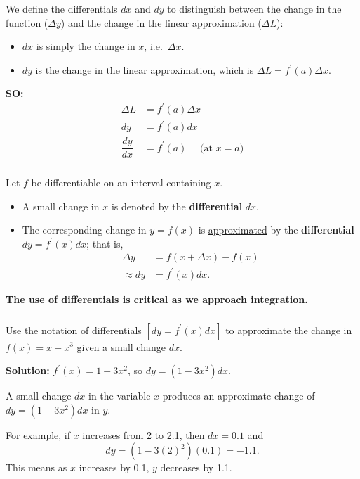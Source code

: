 \documentclass[cal1spr16Lectures.tex]{subfiles}
\begin{document}
\begin{frame}
\small
We define the differentials $dx$ and $dy$ to distinguish between the \alert{change in the function ($\Delta y$)} and the \alert{change in the linear approximation ($\Delta L$)}: 
\begin{itemize}
\item $dx$ is simply the change in $x$, i.e.\ $\Delta x$.
\item $dy$ is the change in the linear approximation, which is $\Delta L=f^{\prime}(a) \Delta x$.
\end{itemize}

{\bf SO:}
\begin{align*}
\Delta L &= f^{\prime}(a) \Delta x \\[0.5pc]
dy &= f^{\prime}(a) dx \\[0.5pc]
\dfrac{dy}{dx} &= f^{\prime}(a)\quad \text{ (at $x=a$)}
\end{align*}
\end{frame}

\begin{frame}
\frametitle{}
\small
\begin{dfn} Let $f$ be differentiable on an interval containing $x$.
\begin{itemize}
\item A small change in $x$ is denoted by the {\bf differential} $dx$.
\item The corresponding change in $y=f(x)$ is \underline{approximated} by the {\bf differential} $dy=f^{\prime}(x)dx$; that is,
\begin{align*}
\Delta y& = f(x+\Delta x)-f(x) \\[0.5pc]
\approx dy &= f^{\prime}(x)dx.
\end{align*}
\end{itemize}
\end{dfn}

\vspace{1pc}
{\bf The use of differentials is critical as we approach integration.}
\end{frame}

\begin{frame}
\frametitle{}
\small
\begin{ex} Use the notation of differentials $[dy = f^{\prime}(x) dx]$ to approximate the change in $f(x)=x-x^3$ given a small change $dx$. \end{ex}

{\bf Solution:} $f^{\prime}(x)=1-3x^2$, so $dy=(1-3x^2)dx.$

A small change $dx$ in the variable $x$ produces an approximate change of $dy=(1-3x^2)dx$ in $y$.

\vspace{1.5pc}
For example, if $x$ increases from 2 to 2.1, then $dx=0.1$ and 
\[dy=\left(1-3(2)^2 \right)(0.1)=-1.1.\]
This means as $x$ increases by 0.1, $y$ decreases by 1.1.
\end{frame}
\end{document}
